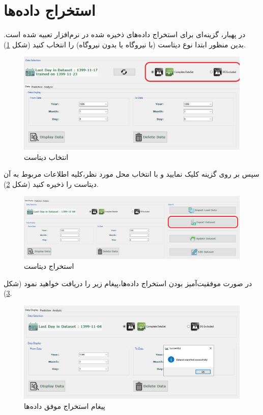 \documentclass[a4paper,20pt,dvipsnames, usenames]{extbook}
\begin{document}
\section{استخراج داده‌ها}	
در پهبار، گزینه‌ای برای استخراج داده‌های ذخیره شده در نرم‌افزار تعبیه شده است. بدین منظور ابتدا نوع دیتاست (با نیروگاه یا بدون نیروگاه) را انتخاب کنید (شکل
\ref{fig5}).
\begin{figure}[!h]
	\centering
	\includegraphics[width = \textwidth]{fig1}
	\caption{انتخاب دیتاست}
	\label{fig5}
\end{figure}
سپس بر روی گزینه
کلیک نمایید و با انتخاب محل مورد نظر،‌کلیه اطلاعات مربوط به آن دیتاست را ذخیره کنید (شکل
\ref{fig6}).
\begin{figure}[!h]
	\centering
	\includegraphics[width = \textwidth]{fig19}
	\caption{استخراج دیتاست}
	\label{fig6}
\end{figure}
در صورت موفقیت‌آمیز بودن استخراج داده‌ها،‌پیغام زیر را دریافت خواهید نمود (شکل
\ref{fig7}).
\begin{figure}[!h]
	\centering
	\includegraphics[width = \textwidth]{fig20}
	\caption{پیغام استخراج موفق داده‌ها}
	\label{fig7}
\end{figure}
\end{document}
